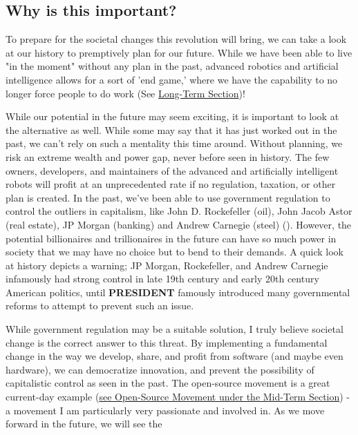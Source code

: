 \subsection{Why is this important?}

To prepare for the societal changes this revolution will bring, we can take a look at our history to premptively plan for our future. While we have been able to live "in the moment" without any plan in the past, advanced robotics and artificial intelligence allows for a sort of 'end game,' where we have the capability to no longer force people to do work (See \hyperlink{sec:long}{Long-Term Section})!

While our potential in the future may seem exciting, it is important to look at the alternative as well. While some may say that it has just worked out in the past, we can't rely on such a mentality this time around. Without planning, we risk an extreme wealth and power gap, never before seen in history. The few owners, developers, and maintainers of the advanced and artificially intelligent robots will profit at an unprecedented rate if no regulation, taxation, or other plan is created. In the past, we've been able to use government regulation to control the outliers in capitalism, like John D. Rockefeller (oil), John Jacob Astor (real estate), JP Morgan (banking) and Andrew Carnegie (steel) (\cite{CapitalistAmerica}). However, the potential billionaires and trillionaires in the future can have so much power in society that we may have no choice but to bend to their demands. A quick look at history depicts a warning; JP Morgan, Rockefeller, and Andrew Carnegie infamously had strong control in late 19th century and early 20th century American politics, until \textbf{PRESIDENT} famously introduced many governmental reforms to attempt to prevent such an issue. %

While government regulation may be a suitable solution, I truly believe societal change is the correct answer to this threat. By implementing a fundamental change in the way we develop, share, and profit from software (and maybe even hardware), we can democratize innovation, and prevent the possibility of capitalistic control as seen in the past. The open-source movement is a great current-day example (\hyperref[subsec:open-source]{see Open-Source Movement under the Mid-Term Section}) - a movement I am particularly very passionate and involved in. As we move forward in the future, we will see the %


